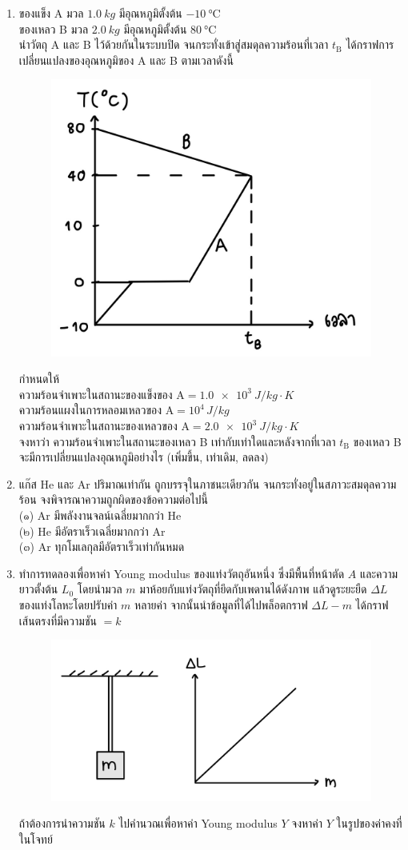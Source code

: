 \documentclass[a4paper,12pt]{article}
\begin{document}
\begin{enumerate}
		\item ของแข็ง A มวล \(\SI{1.0}{kg}\) มีอุณหภูมิตั้งต้น \(\SI{-10}{\degreeCelsius}\)\\
		ของเหลว B มวล \(\SI{2.0}{kg}\) มีอุณหภูมิตั้งต้น \(\SI{80}{\degreeCelsius}\)\\
		นำวัตถุ A และ B ไว้ด้วยกันในระบบปิด จนกระทั่งเข้าสู่สมดุลความร้อนที่เวลา \(t_\text{B}\) ได้กราฟการเปลี่ยนแปลงของอุณหภูมิของ A และ B ตามเวลาดังนี้
		\begin{figure}[h]
			\centering
			\includegraphics[width=0.3\linewidth]{19}
		\end{figure}
		กำหนดให้\\
		ความร้อนจำเพาะในสถานะของแข็งของ \(\text{A}=\SI{1.0e3}{J/kg\cdot K}\)\\
		ความร้อนแผงในการหลอมเหลวของ \(\text{A}=10^4\,\si{J/kg}\)\\
		ความร้อนจำเพาะในสถานะของเหลวของ \(\text{A}=\SI{2.0e3}{J/kg\cdot K}\)\\
		จงหาว่า ความร้อนจำเพาะในสถานะของเหลว B เท่ากับเท่าใดและหลังจากที่เวลา \(t_\text{B}\) ของเหลว B จะมีการเปลี่ยนแปลงอุณหภูมิอย่างไร (เพิ่มขึ้น, เท่าเดิม, ลดลง\textenglish{)}
			\vspace{4cm}
		
		\item แก๊ส He และ Ar ปริมาณเท่ากัน ถูกบรรจุในภาชนะเดียวกัน จนกระทั่งอยู่ในสภาวะสมดุลความร้อน จงพิจารณาความถูกผิดของข้อความต่อไปนี้\\
		(๑\textenglish{)} Ar มีพลังงานจลน์เฉลี่ยมากกว่า He\\
		(๒\textenglish{)} He มีอัตราเร็วเฉลี่ยมากกว่า Ar\\
		(๓\textenglish{)} Ar ทุกโมเลกุลมีอัตราเร็วเท่ากันหมด
			\vspace{4cm}
		
		\item ทำการทดลองเพื่อหาค่า Young modulus ของแท่งวัตถุอันหนึ่ง ซึ่งมีพื้นที่หน้าตัด \(A\) และความยาวตั้งต้น \(L_0\) โดยนำมวล \(m\) มาห้อยกับแท่งวัตถุที่ยึดกับเพดานได้ดังภาพ แล้วดูระยะยืด \(\Delta L\) ของแท่งโลหะโดยปรับค่า \(m\) หลายค่า จากนั้นนำข้อมูลที่ได้ไปพล็อตกราฟ \(\Delta L-m\) ได้กราฟเส้นตรงที่มีความชัน \(=k\)
		\begin{figure}[h]
			\centering
			\includegraphics[width=0.5\linewidth]{21}
		\end{figure}
		ถ้าต้องการนำความชัน \(k\) ไปคำนวณเพื่อหาค่า Young modulus \(Y\) จงหาค่า \(Y\) ในรูปของค่าคงที่ในโจทย์
			\vspace{6cm}
		

\end{enumerate}
\end{document}
